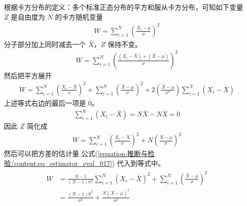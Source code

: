 \documentclass[letterpaper,10pt,english]{sphinxmanual}
\begin{document}
根据卡方分布的定义：多个标准正态分布的平方和服从卡方分布，可知如下变量 \(Z\) 是自由度为 \(N\) 的卡方随机变量
\begin{equation}\label{equation:推断与检验/content:推断与检验/content:10}
\begin{split}W = \sum_{i=1}^N \left ( \frac{X_i-\mu}{\sigma} \right )^2\end{split}
\end{equation}
分子部分加上同时减去一个 \(\bar{X}\)，\(Z\) 保持不变。
\begin{equation}\label{equation:推断与检验/content:推断与检验/content:11}
\begin{split}W = \sum_{i=1}^N \left (  \frac{(X_i -\bar{X})+(\bar{X}-\mu)}{\sigma} \right )^2\end{split}
\end{equation}
然后把平方展开
\begin{equation}\label{equation:推断与检验/content:推断与检验/content:12}
\begin{split}W = \sum_{i=1}^N \left ( \frac{X_i -\bar{X}}{\sigma} \right )^2
+ \sum_{i=1}^N \left ( \frac{\bar{X}-\mu}{\sigma} \right )^2
+2 \left ( \frac{\bar{X}-\mu}{\sigma^2}  \right ) \sum_{i=1}^N (X_i -\bar{X})\end{split}
\end{equation}
上述等式右边的最后一项是 \(0\)。
\begin{equation}\label{equation:推断与检验/content:推断与检验/content:13}
\begin{split}\sum_{i=1}^N (X_i -\bar{X}) = N \bar{X} - N \bar{X} = 0\end{split}
\end{equation}
因此 \(Z\) 简化成
\begin{equation}\label{equation:推断与检验/content:推断与检验/content:14}
\begin{split}W = \sum_{i=1}^N \left ( \frac{X_i -\bar{X}}{\sigma} \right )^2
+ N \left ( \frac{\bar{X}-\mu}{\sigma} \right )^2\end{split}
\end{equation}
然后可以把方差的估计量 公式(\ref{equation:推断与检验/content:eq_estimator_eval_017}) 代入到等式中。
\begin{align}\label{equation:推断与检验/content:推断与检验/content:15}\!\begin{aligned}
W &=   \frac{N-1}{(N-1) \sigma^2} \sum_{i=1}^N  \left ( X_i -\bar{X} \right )^2
+ \sum_{i=1}^N \left ( \frac{\bar{X}-\mu}{\sigma} \right )^2\\
&=   \frac{(N-1) \hat{\sigma}^2}{\sigma^2}  + \frac{ N (\bar{X}-\mu)^2 }{\sigma^2}\\
\end{aligned}\end{align}
\end{document}
